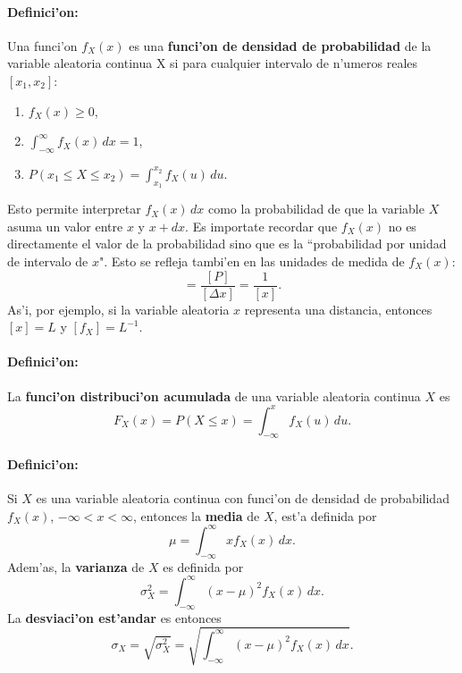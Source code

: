 \documentclass[letterpaper,11pt]{report}
\begin{document}
\paragraph{Definici'on:} Una funci'on $f_X(x)$ es una \textbf{funci'on de densidad de probabilidad} de la variable aleatoria continua X si para cualquier intervalo de n'umeros reales $[x_1,x_2]$:
\begin{enumerate}
\item $f_X(x)\geq 0$,
\item $\int_{-\infty}^\infty f_X(x)\,dx=1$,
\item $P(x_1\le X\le x_2)=\int_{x_1}^{x_2}f_X(u)\,du$.
\end{enumerate}

Esto permite interpretar $f_X(x)\,dx$ como la probabilidad de que la variable $X$ asuma un valor entre $x$ y $x+dx$. Es importate recordar que $f_X(x)$ no es directamente el valor de la probabilidad sino que es la ``probabilidad por unidad de intervalo de $x$". Esto se refleja tambi'en en las unidades de medida de $f_X(x)$:
\begin{equation}
[f_X]=\frac{[P]}{[\Delta x]}=\frac{1}{[x]}.
\end{equation}
As'i, por ejemplo, si la variable aleatoria $x$ representa una distancia, entonces $[x]=L$ y $[f_X]=L^{-1}$.


\paragraph{Definici'on:} La \textbf{funci'on distribuci'on acumulada} de una variable aleatoria continua $X$ es
\begin{equation}
F_X(x)=P(X\le x)=\int_{-\infty}^x f_X(u)\,du.
\end{equation}



\paragraph{Definici'on:} Si $X$ es una variable aleatoria continua con funci'on de densidad de probabilidad $f_X(x)$, $-\infty<x<\infty$, entonces la \textbf{media} de $X$, est'a definida por
\begin{equation}
\mu=\int_{-\infty}^\infty xf_X(x)\,dx.
\end{equation}
Adem'as, la \textbf{varianza} de $X$ es definida por 
\begin{equation}
\sigma_X^2=\int_{-\infty}^\infty (x-\mu)^2f_X(x)\,dx.
\end{equation}
La \textbf{desviaci'on est'andar} es entonces
\begin{equation}
\sigma_X=\sqrt{\sigma_X^2}=\sqrt{\int_{-\infty}^\infty (x-\mu)^2f_X(x)\,dx}.
\end{equation}
\end{document}
